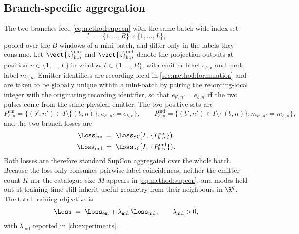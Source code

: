\subsection*{Branch-specific aggregation}

The two branches feed \cref{eq:method:supcon} with the same batch-wide index set
\begin{equation}\label{eq:method:batch_index}
  I \;=\; \{1,\ldots,B\}\!\times\!\{1,\ldots,L\},
\end{equation}
pooled over the $B$ windows of a mini-batch, and differ only in the labels they consume.
Let $\vect{z}^{\mathrm{em}}_{b,n}$ and $\vect{z}^{\mathrm{md}}_{b,n}$ denote the projection outputs at position $n \in \{1,\ldots,L\}$ in window $b \in \{1,\ldots,B\}$, with emitter label $e_{b,n}$ and mode label $m_{b,n}$.
Emitter identifiers are recording-local in \cref{sec:method:formulation} and are taken to be globally unique within a mini-batch by pairing the recording-local integer with the originating recording identifier, so that $e_{b',n'} = e_{b,n}$ iff the two pulses come from the same physical emitter.
The two positive sets are
\begin{equation}\label{eq:method:positive_sets}
  P^{\mathrm{em}}_{b,n} = \{(b',n') \in I\setminus\{(b,n)\} : e_{b',n'} = e_{b,n}\},
  \qquad
  P^{\mathrm{md}}_{b,n} = \{(b',n') \in I\setminus\{(b,n)\} : m_{b',n'} = m_{b,n}\},
\end{equation}
and the two branch losses are
\begin{align}
  \Loss_{\mathrm{em}} &\;=\; \Loss_{\mathrm{SC}}\!\bigl(I,\, \{P^{\mathrm{em}}_{b,n}\}\bigr),
    \label{eq:method:loss_emitter}\\
  \Loss_{\mathrm{md}} &\;=\; \Loss_{\mathrm{SC}}\!\bigl(I,\, \{P^{\mathrm{md}}_{b,n}\}\bigr).
    \label{eq:method:loss_mode}
\end{align}
Both losses are therefore standard SupCon \parencite{khosla2020supcon} aggregated over the whole batch.
Because the loss only consumes pairwise label coincidences, neither the emitter count $K$ nor the catalogue size $M$ appears in \cref{eq:method:supcon}, and modes held out at training time still inherit useful geometry from their neighbours in $\R^{q}$.
The total training objective is
\begin{equation}\label{eq:method:loss_total}
  \Loss \;=\; \Loss_{\mathrm{em}} + \lambda_{\mathrm{md}}\,\Loss_{\mathrm{md}},
  \qquad \lambda_{\mathrm{md}} > 0,
\end{equation}
with $\lambda_{\mathrm{md}}$ reported in \cref{ch:experiments}.
